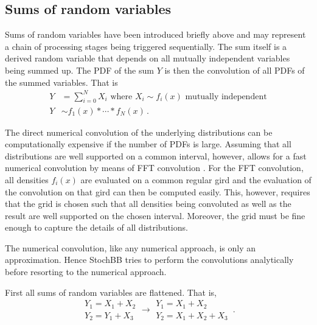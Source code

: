 \subsection{Sums of random variables}
Sums of random variables have been introduced briefly above and may represent a chain of processing
stages being triggered sequentially. The sum itself is a derived random variable that depends on all
mutually independent variables being summed up. The PDF of the sum $Y$ is then the convolution of all
PDFs of the summed variables. That is
\begin{align}
 Y &= \sum_{i=0}^NX_i\text{ where } X_i \sim f_i(x)\text{ mutually independent} \nonumber \\
 Y &\sim f_1(x) \ast \cdots \ast f_N(x)\,. \nonumber
\end{align}

The direct numerical convolution of the underlying distributions can be computationally expensive if the
number of PDFs is large. Assuming that all distributions are well supported on a common interval, however, 
allows for a fast numerical convolution by means of FFT convolution \cite{Press2007}. For the FFT convolution, all 
densities $f_i(x)$ are evaluated on a common regular gird and the evaluation of the convolution on that gird
can then be computed easily. This, however, requires that the grid is chosen such that all densities being
convoluted as well as the result are well supported on the chosen interval. Moreover, the grid must be fine 
enough to capture the details of all distributions. 

The numerical convolution, like any numerical approach, is only an approximation. Hence StochBB tries to perform
the convolutions analytically before resorting to the numerical approach. 

First all sums of random variables are flattened. That is, 
\begin{equation}
 \begin{array}{l}
  Y_1 = X_1 + X_2\\
  Y_2 = Y_1 + X_3 
 \end{array} \longrightarrow 
 \begin{array}{l}
  Y_1 = X_1 + X_2\\
  Y_2 = X_1 + X_2 + X_3 
 \end{array}\,. \nonumber
\end{equation}


